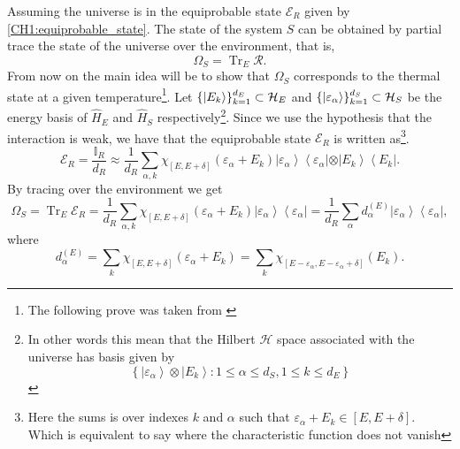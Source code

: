 Assuming the universe is in the equiprobable state $\mathcal{E}_R$ given by \eqref{CH1:equiprobable_state}.  The state of the system $S$ can be obtained by partial trace the state of the universe over the environment, that is,
\begin{equation}
\Omega_S = \operatorname{Tr}_{E}\mathcal{R}.
\label{CH1:Canonical_state}
\end{equation}
From now on the main idea will be to show that $\Omega_S$ corresponds to the  thermal state at a given temperature\footnote{The following prove was taken from \cite{huang_statistical_1987}}.
\newline
Let $\{\mathinner{|{E_k}\rangle}\}_{k=1}^{d_E}\subset \mathcal{H}_E$ and $\{\mathinner{|{\varepsilon_\alpha}\rangle}\}_{k=1}^{d_S}\subset \mathcal{H}_S$ be the energy basis of $\hat{H}_E$ and $\hat{H}_S$ respectively\footnote{In other words this mean that the Hilbert $\mathcal{H}$ space associated with the universe has basis given by
\[\left\{\left|\varepsilon_{\alpha}\right\rangle \otimes\left|E_{k}\right\rangle: 1 \leq \alpha \leq d_{S}, 1 \leq k \leq d_{E}\right\}\]}. Since we use the hypothesis that the interaction is weak, we have that the equiprobable state $\mathcal{E}_R$ is written as\footnote{Here the sums is over indexes $k$ and $\alpha$ such that $\varepsilon_{\alpha}+E_{k}\in [E,E+\delta]$. Which is equivalent to say where the characteristic function does not vanish}.
\begin{equation}
\mathcal{E}_{R}=\frac{\mathbb{I}_{R}}{d_{R}} \approx \frac{1}{d_{R}} \sum_{\alpha, k} \chi_{[E, E+\delta]}\left(\varepsilon_{\alpha}+E_{k}\right)\left|\varepsilon_{\alpha}\right\rangle\left\langle\varepsilon_{\alpha}|\otimes| E_{k}\right\rangle\left\langle E_{k}\right|.
\label{CH1:equiprobable_canonical_1}
\end{equation}
By tracing over the environment we get
\begin{equation}
\Omega_{S}=
\operatorname{Tr}_{E} \mathcal{E}_{R}=
\frac{1}{d_{R}} \sum_{\alpha, k} \chi_{[E, E+\delta]}\left(\varepsilon_{\alpha}+E_{k}\right)\left|\varepsilon_{\alpha}\right\rangle\left\langle\varepsilon_{\alpha}\right|=
\frac{1}{d_{R}} \sum_{\alpha} d_{\alpha}^{(E)}\left| \varepsilon_{\alpha}\right\rangle\left\langle\varepsilon_{\alpha}\right|,
\label{CH1:equiprobable_canonical_2}
\end{equation}
where
\begin{equation}
d_{\alpha}^{(E)}=\sum_{k} \chi_{[E, E+\delta]}\left(\varepsilon_{\alpha}+E_{k}\right)=\sum_{k} \chi_{\left[E-\varepsilon_{\alpha}, E-\varepsilon_{\alpha}+\delta\right]}\left(E_{k}\right).
\label{CH1:equiprobable_canonical_3}
\end{equation}
